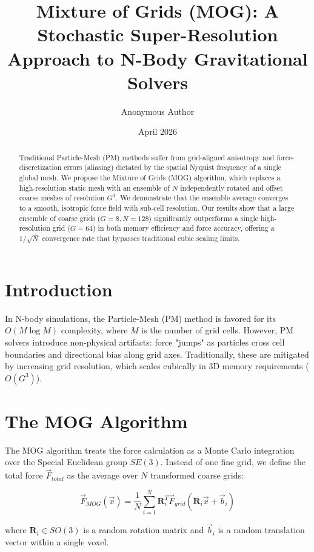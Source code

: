 \documentclass[twocolumn]{article}
\title{Mixture of Grids (MOG): A Stochastic Super-Resolution Approach to N-Body Gravitational Solvers}
\author{Anonymous Author}
\date{April 2026}
\begin{document}
	
	\maketitle
	
	\begin{abstract}
		Traditional Particle-Mesh (PM) methods suffer from grid-aligned anisotropy and force-discretization errors (aliasing) dictated by the spatial Nyquist frequency of a single global mesh. We propose the Mixture of Grids (MOG) algorithm, which replaces a high-resolution static mesh with an ensemble of $N$ independently rotated and offset coarse meshes of resolution $G^3$. We demonstrate that the ensemble average converges to a smooth, isotropic force field with sub-cell resolution. Our results show that a large ensemble of coarse grids ($G=8, N=128$) significantly outperforms a single high-resolution grid ($G=64$) in both memory efficiency and force accuracy, offering a $1/\sqrt{N}$ convergence rate that bypasses traditional cubic scaling limits.
	\end{abstract}
	
	\section{Introduction}
	In N-body simulations, the Particle-Mesh (PM) method is favored for its $O(M \log M)$ complexity, where $M$ is the number of grid cells. However, PM solvers introduce non-physical artifacts: force "jumps" as particles cross cell boundaries and directional bias along grid axes. Traditionally, these are mitigated by increasing grid resolution, which scales cubically in 3D memory requirements ($O(G^3)$).
	
	\section{The MOG Algorithm}
	The MOG algorithm treats the force calculation as a Monte Carlo integration over the Special Euclidean group $SE(3)$. Instead of one fine grid, we define the total force $\vec{F}_{total}$ as the average over $N$ transformed coarse grids:
	
	\begin{equation}
		\vec{F}_{MOG}(\vec{x}) = \frac{1}{N} \sum_{i=1}^{N} \mathbf{R}_i^T \vec{F}_{grid} \left( \mathbf{R}_i \vec{x} + \vec{b}_i \right)
	\end{equation}
	
	where $\mathbf{R}_i \in SO(3)$ is a random rotation matrix and $\vec{b}_i$ is a random translation vector within a single voxel.
	
\end{document}
